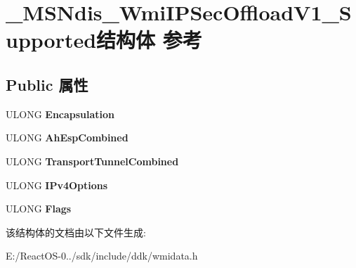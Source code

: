 \hypertarget{struct___m_s_ndis___wmi_i_p_sec_offload_v1___supported}{}\section{\+\_\+\+M\+S\+Ndis\+\_\+\+Wmi\+I\+P\+Sec\+Offload\+V1\+\_\+\+Supported结构体 参考}
\label{struct___m_s_ndis___wmi_i_p_sec_offload_v1___supported}
\subsection*{Public 属性}
\begin{DoxyCompactItemize}
\item 
\mbox{\label{struct___m_s_ndis___wmi_i_p_sec_offload_v1___supported_a632b1e7d0d8e66ebf0369da45ab1d754}} 
U\+L\+O\+NG {\bfseries Encapsulation}
\item 
\mbox{\label{struct___m_s_ndis___wmi_i_p_sec_offload_v1___supported_a7edbce9e6c897d38c6c412184af0a7af}} 
U\+L\+O\+NG {\bfseries Ah\+Esp\+Combined}
\item 
\mbox{\label{struct___m_s_ndis___wmi_i_p_sec_offload_v1___supported_a878447e702712971fa9a2d4574b5291c}} 
U\+L\+O\+NG {\bfseries Transport\+Tunnel\+Combined}
\item 
\mbox{\label{struct___m_s_ndis___wmi_i_p_sec_offload_v1___supported_a5bc9b389f12d87a2ab732e11f7876d09}} 
U\+L\+O\+NG {\bfseries I\+Pv4\+Options}
\item 
\mbox{\label{struct___m_s_ndis___wmi_i_p_sec_offload_v1___supported_aa7932960cfaa0cc86582d78403e59149}} 
U\+L\+O\+NG {\bfseries Flags}
\end{DoxyCompactItemize}


该结构体的文档由以下文件生成\+:\begin{DoxyCompactItemize}
\item 
E\+:/\+React\+O\+S-\/0../sdk/include/ddk/wmidata.\+h\end{DoxyCompactItemize}
